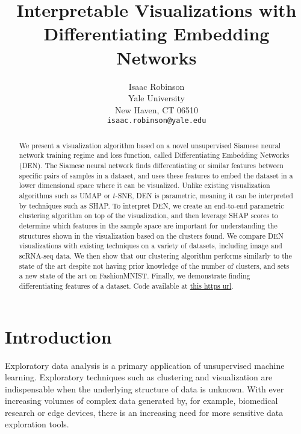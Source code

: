 \documentclass{article}
\title{Interpretable Visualizations with Differentiating Embedding Networks}
\author{Isaac Robinson \\
  Yale University\\
  New Haven, CT 06510 \\
  \texttt{isaac.robinson@yale.edu} \\
}
\begin{document}
\maketitle



\begin{abstract}
    We present a visualization algorithm based on a novel unsupervised Siamese neural network training regime and loss function, called Differentiating Embedding Networks (DEN). The Siamese neural network finds differentiating or similar features between specific pairs of samples in a dataset, and uses these features to embed the dataset in a lower dimensional space where it can be visualized. Unlike existing visualization algorithms such as UMAP or $t$-SNE, DEN is parametric, meaning it can be interpreted by techniques such as SHAP. To interpret DEN, we create an end-to-end parametric clustering algorithm on top of the visualization, and then leverage SHAP scores to determine which features in the sample space are important for understanding the structures shown in the visualization based on the clusters found. We compare DEN visualizations with existing techniques on a variety of datasets, including image and scRNA-seq data. We then show that our clustering algorithm performs similarly to the state of the art despite not having prior knowledge of the number of clusters, and sets a new state of the art on FashionMNIST. Finally, we demonstrate finding differentiating features of a dataset. Code available at \href{https://github.com/isaacrob/DEN}{this https url}.
\end{abstract}

\section{Introduction}













Exploratory data analysis is a primary application of unsupervised machine learning. Exploratory techniques such as clustering and visualization are indispensable when the underlying structure of data is unknown. With ever increasing volumes of complex data generated by, for example, biomedical research or edge devices, there is an increasing need for more sensitive data exploration tools.
\end{document}
